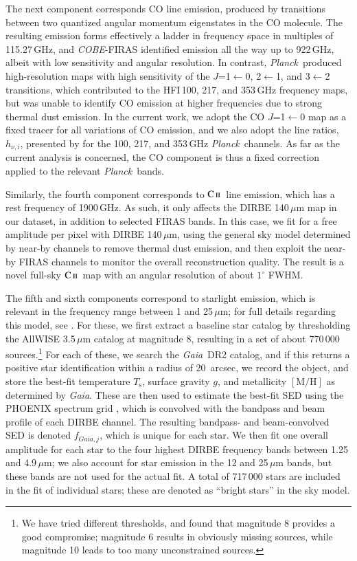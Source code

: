 \documentclass{aa}
\def\Planck{\textit{Planck}}
\def\COBE{\textit{COBE}}
\def\GAIA{\textit{Gaia}}
\newcommand{\CII}{\ensuremath{\textsc{C\,ii}}}
\begin{document}
The next component corresponds CO line emission, produced by
transitions between two quantized angular momentum eigenstates in the
CO molecule. The resulting emission forms effectively a ladder in
frequency space in multiples of 115.27\,GHz, and \COBE-FIRAS
identified emission all the way up to 922\,GHz, albeit with low
sensitivity and angular resolution. In contrast, \Planck\ produced
high-resolution maps with high sensitivity of the $J$=1$\leftarrow$0,
2$\leftarrow$1, and 3$\leftarrow$2 transitions, which contributed to
the HFI\,100, 217, and 353\,GHz frequency maps, but was unable to
identify CO emission at higher frequencies due to strong thermal dust
emission. In the current work, we adopt the \citet{dame:2001} CO
$J$=1$\leftarrow$0 map as a fixed tracer for all variations of CO
emission, and we also adopt the line ratios, $h_{\nu,i}$, presented by
\citet{planck2014-a12} for the 100, 217, and 353\,GHz \Planck\
channels. As far as the current analysis is concerned, the CO
component is thus a fixed correction applied to the relevant
\Planck\ bands.

Similarly, the fourth component corresponds to \CII\ line emission,
which has a rest frequency of 1900\,GHz. As such, it only affects the
DIRBE 140\,$\mu$m map in our dataset, in addition to selected FIRAS
bands. In this case, we fit for a free amplitude per pixel with DIRBE
140\,$\mu$m, using the general sky model determined by near-by
channels to remove thermal dust emission, and then exploit the near-by
FIRAS channels to monitor the overall reconstruction
quality. The result is a novel full-sky \CII\ map with an angular resolution of
about $1^{\circ}$ FWHM.

The fifth and sixth components correspond to starlight emission, which
is relevant in the frequency range between 1 and 25\,$\mu$m; for full
details regarding this model, see \citet{CG02_04}. For these, we first
extract a baseline star catalog by thresholding the AllWISE
3.5\,$\mu$m catalog at magnitude 8, resulting in a set of about
770\,000 sources.\footnote{We have tried different thresholds, and
found that magnitude 8 provides a good compromise; magnitude 6 results
in obviously missing sources, while magnitude 10 leads to too many
unconstrained sources.} For each of these, we search the \GAIA\ DR2
catalog, and if this returns a positive star identification within a
radius of 20~arcsec, we record the object, and store the best-fit
temperature $T_\mathrm{s}$, surface gravity $g$, and metallicity
$[\mathrm{M}/\mathrm{H}]$ as determined by \GAIA. These are then used
to estimate the best-fit SED using the PHOENIX spectrum grid
\citep{husser:2013}, which is convolved with the bandpass and beam
profile of each DIRBE channel. The resulting bandpass- and
beam-convolved SED is denoted $f_{\GAIA,j}$, which is unique for each
star. We then fit one overall amplitude for each star to the four
highest DIRBE frequency bands between 1.25 and 4.9\,$\mu$m; we also
account for star emission in the 12 and 25\,$\mu$m bands, but these
bands are not used for the actual fit. A total of 717\,000 stars are
included in the fit of individual stars; these are denoted as ``bright
stars'' in the sky model.
\end{document}
